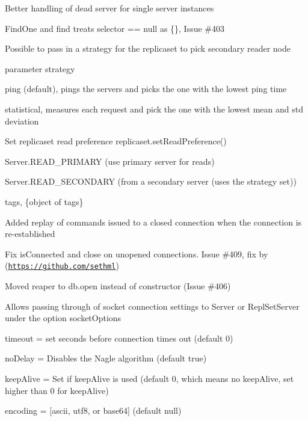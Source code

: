 \begin{DoxyItemize}
\item Better handling of dead server for single server instances
\item Find\+One and find treats selector == null as \{\}, Issue \#403
\item Possible to pass in a strategy for the replicaset to pick secondary reader node
\begin{DoxyItemize}
\item parameter strategy
\begin{DoxyItemize}
\item ping (default), pings the servers and picks the one with the lowest ping time
\item statistical, measures each request and pick the one with the lowest mean and std deviation
\end{DoxyItemize}
\end{DoxyItemize}
\item Set replicaset read preference replicaset.\+set\+Read\+Preference()
\begin{DoxyItemize}
\item Server.\+R\+E\+A\+D\+\_\+\+P\+R\+I\+M\+A\+RY (use primary server for reads)
\item Server.\+R\+E\+A\+D\+\_\+\+S\+E\+C\+O\+N\+D\+A\+RY (from a secondary server (uses the strategy set))
\item tags, \{object of tags\}
\end{DoxyItemize}
\item Added replay of commands issued to a closed connection when the connection is re-\/established
\item Fix is\+Connected and close on unopened connections. Issue \#409, fix by (\href{https://github.com/sethml}{\tt https\+://github.\+com/sethml})
\item Moved reaper to db.\+open instead of constructor (Issue \#406)
\item Allows passing through of socket connection settings to Server or Repl\+Set\+Server under the option socket\+Options
\begin{DoxyItemize}
\item timeout = set seconds before connection times out (default 0)
\item no\+Delay = Disables the Nagle algorithm (default true)
\item keep\+Alive = Set if keep\+Alive is used (default 0, which means no keep\+Alive, set higher than 0 for keep\+Alive)
\item encoding = \mbox{[}\textquotesingle{}ascii\textquotesingle{}, \textquotesingle{}utf8\textquotesingle{}, or \textquotesingle{}base64\textquotesingle{}\mbox{]} (default null)

\end{DoxyItemize}
\end{DoxyItemize}
